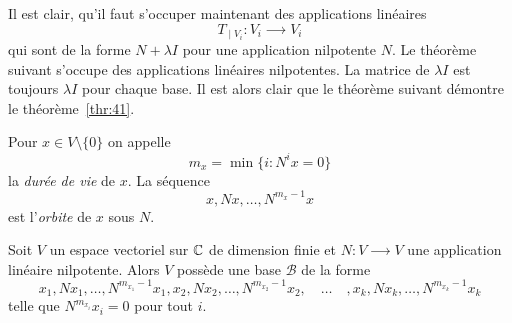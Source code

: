 Il est clair, qu'il faut s'occuper maintenant des applications linéaires 
\begin{displaymath}
  T_{∣V_i} \colon V_i ⟶ V_i 
\end{displaymath}
qui sont de la forme $N + λ I$ pour une application nilpotente $N$. Le théorème suivant s'occupe des applications linéaires nilpotentes. La matrice de $λI$ est toujours $λ I$ pour chaque base. Il est alors clair que le théorème suivant démontre le théorème~\ref{thr:41}. 

\begin{definition}
  \label{def:36}
    Pour $x \in V \setminus \{0\}$ on appelle 
  \begin{displaymath}
    m_x = \min \{ i \colon N^ix = 0\}
  \end{displaymath}
  la \emph{durée de vie} de $x$. 
  La séquence 
  \begin{displaymath}
    x, Nx, \dots, N^{m_x-1} x
  \end{displaymath}
  est l'\emph{orbite} de $x$ sous $N$.
  \end{definition}
  
  

\begin{theorem}
  \label{thr:38}
  Soit $V$ un espace vectoriel sur $\mathbb{C}$ de dimension finie et $N\colon V ⟶V$  une application linéaire nilpotente.  Alors $V$ possède une base $ℬ$ de la forme 
  \begin{displaymath}
    x_1,Nx_1, \dots, N^{m_{x_1}-1}x_1, x_2,Nx_2, \ldots , N^{m_{x_2}-1}x_2, \quad \dots \quad , x_k,Nx_k, \dots, N^{m_{x_k}-1}x_k
  \end{displaymath}
telle que $N^{m_{x_i}}x_i = 0$ pour tout $i$. 
\end{theorem}

